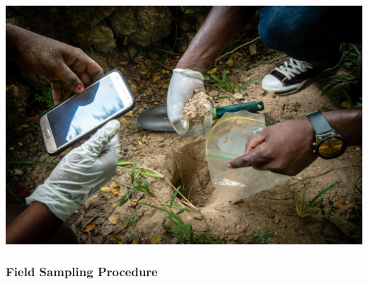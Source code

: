 \documentclass[a4paper,12pt]{article}
\begin{document}
\includegraphics[width=\textwidth]{DSC05592.jpg}  

\subsubsection{Field Sampling Procedure}
\end{document}
